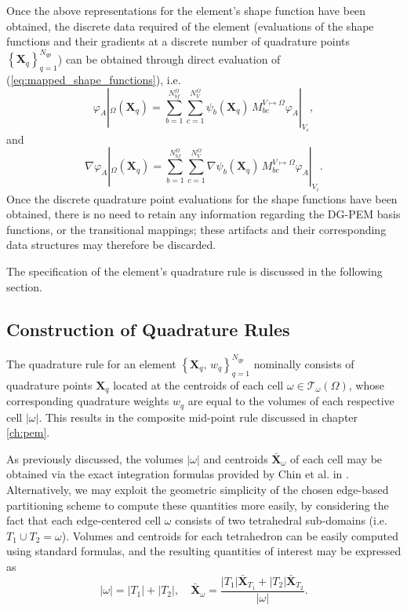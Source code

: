 	Once the above representations for the element's shape function have been obtained, the discrete data required of the element (evaluations of the shape functions and their gradients at a discrete number of quadrature points $\left\{ \mathbf{X}_q \right\}_{q=1}^{N_{qp}}$) can be obtained through direct evaluation of (\ref{eq:mapped_shape_functions}), i.e.
	\begin{equation}
		\varphi_A |_{\Omega} (\mathbf{X}_q) = \sum_{b = 1}^{N^\Omega_{bf}} \sum_{c = 1}^{N^\Omega_{V}} \psi_b (\mathbf{X}_q) \, M^{V \mapsto \Omega}_{bc} \varphi_A |_{V_c},
	\end{equation}
	and
	\begin{equation}
		\nabla \varphi_A |_{\Omega} (\mathbf{X}_q) = \sum_{b = 1}^{N^\Omega_{bf}} \sum_{c = 1}^{N^\Omega_{V}} \nabla \psi_b (\mathbf{X}_q) \, M^{V \mapsto \Omega}_{bc} \varphi_A |_{V_c}.
	\end{equation}
	Once the discrete quadrature point evaluations for the shape functions have been obtained, there is no need to retain any information regarding the DG-PEM basis functions, or the transitional mappings; these artifacts and their corresponding data structures may therefore be discarded.

	The specification of the element's quadrature rule is discussed in the following section.

\subsection*{Construction of Quadrature Rules}

	The quadrature rule for an element $\left\{ \mathbf{X}_q, \, w_q \right\}_{q=1}^{N_{qp}}$ nominally consists of quadrature points $\mathbf{X}_q$ located at the centroids of each cell $\omega \in \mathcal{T}_\omega (\Omega)$, whose corresponding quadrature weights $w_q$ are equal to the volumes of each respective cell $|\omega|$. This results in the composite mid-point rule discussed in chapter \ref{ch:pem}.

	As previously discussed, the volumes $|\omega|$ and centroids $\bar{\mathbf{X}}_\omega$ of each cell may be obtained via the exact integration formulas provided by Chin et al. in \cite{Chin:15}. Alternatively, we may exploit the geometric simplicity of the chosen edge-based partitioning scheme to compute these quantities more easily, by considering the fact that each edge-centered cell $\omega$ consists of two tetrahedral sub-domains (i.e. $T_1 \cup T_2 = \omega$). Volumes and centroids for each tetrahedron can be easily computed using standard formulas, and the resulting quantities of interest may be expressed as
	\begin{equation}
		|\omega| = |T_1| + |T_2|, \quad \bar{\mathbf{X}}_\omega = \frac{|T_1| \bar{\mathbf{X}}_{T_1} + |T_2| \bar{\mathbf{X}}_{T_2}}{|\omega|}.
	\end{equation}

